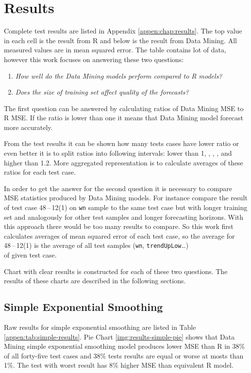     \section{Results}
    Complete test results are listed in Appendix \ref{appen:chap:results}. The top value in each cell is the result
    from R and below is the result from Data Mining. All measured values are in mean squared error. The table contains
    lot of data, however this work focuses on answering these two questions:

    \begin{enumerate}
        \item \emph{How well do the Data Mining models perform compared to R models?} \label{itm:question2}
        \item \emph{Does the size of training set affect quality of the forecasts?} \label{itm:question1}
    \end{enumerate}

    The first question can be answered by calculating ratios of Data Mining MSE to R MSE. If the ratio is lower than
    one it means that Data Mining model forecast more accurately.

    From the test results it can be shown how many tests cases have lower ratio or even better it is to split ratios
    into following intervals:
    lower than 1, \interval[{1,1.01}], \interval[{1.01,1.05}], \interval[{1.05,1.10}], \interval[{1.1,1.2}]
    and higher than 1.2. More aggregated representation is to calculate averages of these ratios for each test case.

    In order to get the answer for the second question it is necessary to compare MSE statistics produced by Data
    Mining models. For instance compare the result of test case 48\,--\,12(1) on \texttt{wn} sample to the same test
    case but with longer training set and analogously for other test samples and longer forecasting horizons. With
    this approach there would be too many results to compare. So this work first calculates averages of mean squared
    error of each test case, so the average for 48\,--\,12(1) is the average of all test samples (\texttt{wn},
    \texttt{trendUpLow}\dots) \\ of given test case.

    Chart with clear results is constructed for each of these two questions. The results of these charts are
    described in the following sections.

        \subsection{Simple Exponential Smoothing} \label{sec:results-simple}
        Raw results for simple exponential smoothing are listed in Table \ref{appen:tab:simple-results}.
        Pie Chart \ref{img:results-simple-pie} shows that Data Mining simple exponential smoothing model produces
        lower MSE than R in 38\% of all forty-five test cases and 38\% tests results are equal or worse at mosts than
        1\%. The test with worst result has 8\% higher MSE than equivalent R model.

